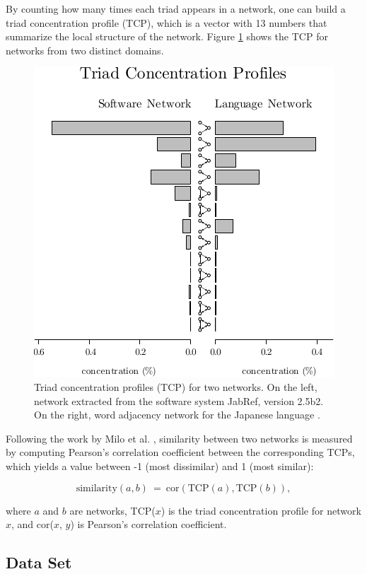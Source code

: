 By counting how many times each triad appears in a network, one can build a
triad concentration profile (TCP), which is a vector with 13 numbers that
summarize the local structure of the network. Figure \ref{fig:profiles} shows
the TCP for networks from two distinct domains.

\begin{figure}[t]
\center
\includegraphics{tcp}
\caption{Triad concentration profiles (TCP) for two networks. On the left,
network extracted from the software system JabRef, version 2.5b2. On the
right, word adjacency network for the Japanese language \cite{Milo2004}.}
\label{fig:profiles}
\end{figure}

Following the work by Milo et al. \cite{Milo2004}, similarity between two
networks is measured by computing Pearson's correlation coefficient between the
corresponding TCPs, which yields a value between -1 (most dissimilar) and 1
(most similar):

$$
\mathrm{similarity}(a, b) ~=~ 
  \mathrm{cor}(\mathrm{TCP}(a), \mathrm{TCP}(b))\mathrm{,}
$$

where $a$ and $b$ are networks, TCP($x$) is the triad concentration profile for
network $x$, and cor($x$, $y$) is Pearson's correlation coefficient.

\subsection{Data Set}

